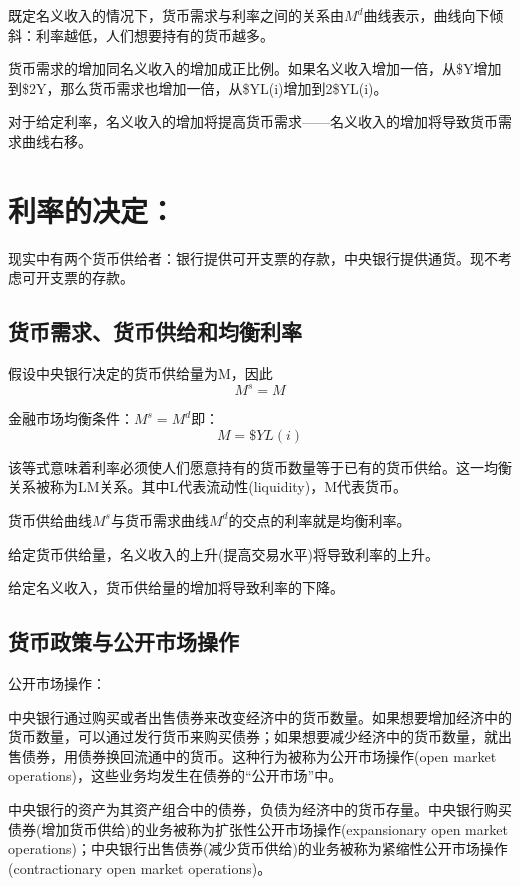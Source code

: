 \documentclass{article}
\begin{document}
既定名义收入的情况下，货币需求与利率之间的关系由$ M^d $曲线表示，曲线向下倾斜：利率越低，人们想要持有的货币越多。

货币需求的增加同名义收入的增加成正比例。如果名义收入增加一倍，从\$Y增加到\$2Y，那么货币需求也增加一倍，从\$YL(i)增加到2\$YL(i)。

对于给定利率，名义收入的增加将提高货币需求——名义收入的增加将导致货币需求曲线右移。

\section{利率的决定：\uppercase\expandafter{}}
现实中有两个货币供给者：银行提供可开支票的存款，中央银行提供通货。现不考虑可开支票的存款。

\subsection{货币需求、货币供给和均衡利率}

假设中央银行决定的货币供给量为M，因此
\[
M^s=M
\]

金融市场均衡条件：$ M^s=M^d $即：
\[
M=\$YL(i)
\]

该等式意味着利率必须使人们愿意持有的货币数量等于已有的货币供给。这一均衡关系被称为LM关系。其中L代表流动性(liquidity)，M代表货币。

货币供给曲线$ M^s $与货币需求曲线$ M^d $的交点的利率就是均衡利率。

给定货币供给量，名义收入的上升(提高交易水平)将导致利率的上升。

给定名义收入，货币供给量的增加将导致利率的下降。

\subsection{货币政策与公开市场操作}
公开市场操作：

中央银行通过购买或者出售债券来改变经济中的货币数量。如果想要增加经济中的货币数量，可以通过发行货币来购买债券；如果想要减少经济中的货币数量，就出售债券，用债券换回流通中的货币。这种行为被称为公开市场操作(open market operations)，这些业务均发生在债券的“公开市场”中。

中央银行的资产为其资产组合中的债券，负债为经济中的货币存量。中央银行购买债券(增加货币供给)的业务被称为扩张性公开市场操作(expansionary open market operations)；中央银行出售债券(减少货币供给)的业务被称为紧缩性公开市场操作(contractionary open market operations)。

\hspace*{\fill}
\end{document}
